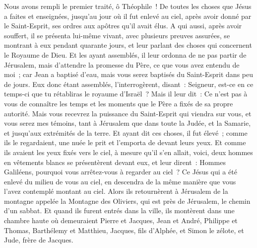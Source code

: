 \begin{multicols}{2}
\VerseOne{}Nous avons rempli le premier traité, ô Théophile~! De toutes les choses que Jésus a faites et enseignées,
jusqu'au jour où il fut enlevé au ciel, après avoir donné par le Saint-Esprit, ses ordres aux apôtres qu'il avait élus.
A qui aussi, après avoir souffert, il se présenta lui-même vivant, avec plusieurs preuves assurées, se montrant à eux  pendant quarante jours, et leur parlant des choses qui concernent le Royaume de Dieu.
Et les ayant assemblés, il leur ordonna de ne pas partir de Jérusalem, mais d'attendre la promesse du Père, ce que vous avez entendu de moi~;
car Jean a baptisé d'eau, mais vous serez baptisés du Saint-Esprit dans peu de jours.
Eux donc étant assemblés, l'interrogèrent, disant~: Seigneur, est-ce en ce temps-ci que tu rétabliras le royaume d'Israël~?
Mais il leur dit~: Ce n'est pas à vous de connaître les temps et les moments que le Père a fixés de sa propre autorité.
Mais vous recevrez la puissance du Saint-Esprit qui viendra sur vous, et vous serez mes témoins, tant à Jérusalem que dans toute la Judée, et la Samarie, et jusqu'aux extrémités de la terre.
Et ayant dit ces choses, il fut élevé~; comme ils le regardaient, une nuée le prit et l'emporta de devant leurs yeux.
Et comme ils avaient les yeux fixés vers le ciel, à mesure qu'il s'en allait, voici, deux hommes en vêtements blancs se présentèrent devant eux,
et leur dirent~: Hommes Galiléens, pourquoi vous arrêtez-vous à regarder au ciel~? Ce Jésus qui a été enlevé du milieu de vous au ciel, en descendra de la même manière que vous l'avez contemplé montant au ciel.
Alors ils retournèrent à Jérusalem de la montagne appelée la Montagne des Oliviers, qui est près de Jérusalem, le chemin d'un sabbat.
Et quand ils furent entrés dans la ville, ils montèrent dans une chambre haute où demeuraient Pierre et Jacques, Jean et André, Philippe et Thomas, Barthélemy et Matthieu, Jacques, fils d'Alphée, et Simon le zélote, et Jude, frère de Jacques.

\end{multicols}
